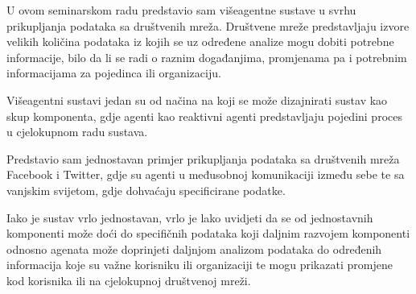 \documentclass[a4paper,12pt]{foi}
\begin{document}
U ovom seminarskom radu predstavio sam višeagentne sustave u svrhu prikupljanja podataka sa društvenih mreža. Društvene mreže predstavljaju izvore velikih količina podataka iz kojih se uz određene analize mogu dobiti potrebne informacije, bilo da li se radi o raznim događanjima, promjenama pa i potrebnim informacijama za pojedinca ili organizaciju.

Višeagentni sustavi jedan su od načina na koji se može dizajnirati sustav kao skup komponenta, gdje agenti kao reaktivni agenti predstavljaju pojedini proces u cjelokupnom radu sustava.

Predstavio sam jednostavan primjer prikupljanja podataka sa društvenih mreža Facebook i Twitter, gdje su agenti u međusobnoj komunikaciji između sebe te sa vanjskim svijetom, gdje dohvaćaju specificirane podatke. 

Iako je sustav vrlo jednostavan, vrlo je lako uvidjeti da se od jednostavnih komponenti može doći do specifičnih podataka koji daljnim razvojem komponenti odnosno agenata može doprinjeti daljnjom analizom podataka do određenih informacija koje su važne korisniku ili organizaciji te mogu prikazati promjene kod korisnika ili na cjelokupnoj društvenoj mreži.



\end{document}
